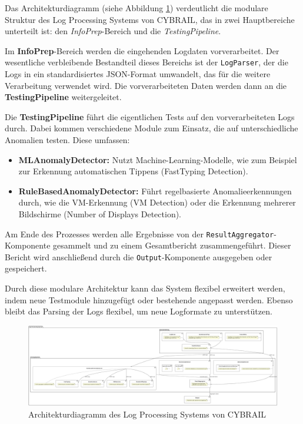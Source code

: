 Das Architekturdiagramm (siehe Abbildung \ref{fig:Architektur}) verdeutlicht die modulare Struktur des Log Processing Systems von CYBRAIL, das in zwei Hauptbereiche unterteilt ist: den \textit{InfoPrep}-Bereich und die \textit{TestingPipeline}.

Im \textbf{InfoPrep}-Bereich werden die eingehenden Logdaten vorverarbeitet. Der wesentliche verbleibende Bestandteil dieses Bereichs ist der \texttt{LogParser}, der die Logs in ein standardisiertes JSON-Format umwandelt, das für die weitere Verarbeitung verwendet wird. Die vorverarbeiteten Daten werden dann an die \textbf{TestingPipeline} weitergeleitet.

Die \textbf{TestingPipeline} führt die eigentlichen Tests auf den vorverarbeiteten Logs durch. Dabei kommen verschiedene Module zum Einsatz, die auf unterschiedliche Anomalien testen. Diese umfassen: \begin{itemize} \item \textbf{MLAnomalyDetector:} Nutzt Machine-Learning-Modelle, wie zum Beispiel zur Erkennung automatischen Tippens (FastTyping Detection). \item \textbf{RuleBasedAnomalyDetector:} Führt regelbasierte Anomalieerkennungen durch, wie die VM-Erkennung (VM Detection) oder die Erkennung mehrerer Bildschirme (Number of Displays Detection). \end{itemize}

Am Ende des Prozesses werden alle Ergebnisse von der \texttt{ResultAggregator}-Komponente gesammelt und zu einem Gesamtbericht zusammengeführt. Dieser Bericht wird anschließend durch die \texttt{Output}-Komponente ausgegeben oder gespeichert.

Durch diese modulare Architektur kann das System flexibel erweitert werden, indem neue Testmodule hinzugefügt oder bestehende angepasst werden. Ebenso bleibt das Parsing der Logs flexibel, um neue Logformate zu unterstützen.

\begin{landscape} 
  \begin{figure}[h] \centering \includegraphics[width=1.5\textwidth]{figures/CybrailArchitektur.pdf} \caption{Architekturdiagramm des Log Processing Systems von CYBRAIL} \label{fig:Architektur} \end{figure} \end{landscape}

